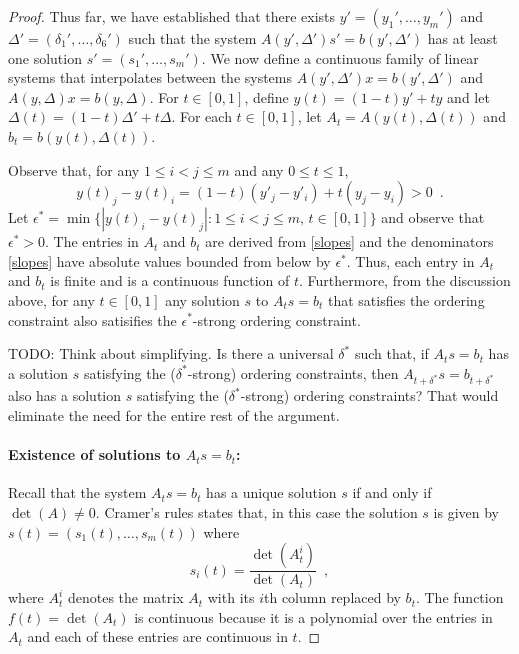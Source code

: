 \documentclass{patmorin}
\begin{document}
\begin{proof}
   Thus far, we have established that there exists $y'=(y_1',\ldots,y_m')$
   and $\Delta'=(\delta_1',\ldots,\delta_6')$ such that the
   system $A(y',\Delta')s' = b(y',\Delta')$ has at least one
   solution $s'=(s_1',\ldots,s_m')$.  We now define a continuous
   family of linear systems that interpolates between the systems
   $A(y',\Delta')x=b(y',\Delta')$ and $A(y,\Delta)x=b(y,\Delta)$.
   For $t\in[0,1]$, define $y(t) = (1-t)y' + ty$ and let
   $\Delta(t)=(1-t)\Delta' + t\Delta$.  For each $t\in [0,1]$, let
   $A_t=A(y(t),\Delta(t))$ and $b_t=b(y(t),\Delta(t))$.

   Observe that, for any $1\le i< j\le m$ and any $0\le t\le 1$,
   \[
       y(t)_j - y(t)_i = (1-t)(y'_j-y'_i) + t(y_j-y_i) > 0 \enspace .
   \]
   Let $\epsilon^*=\min\{|y(t)_i-y(t)_j| : 1\le i< j\le m,\, t\in[0,1]\}$
   and observe that $\epsilon^* >0$.  The entries in $A_t$ and $b_t$
   are derived from \eqref{slopes} and the denominators \eqref{slopes}
   have absolute values bounded from below by $\epsilon^*$.  Thus, each
   entry in $A_t$ and $b_t$ is finite and is a continuous function of $t$. 
   Furthermore, from the discussion above, for any $t\in[0,1]$ any
   solution $s$ to $A_t s =b_t$ that satisfies the ordering constraint
   also satisifies the $\epsilon^*$-strong ordering constraint.


   TODO: Think about simplifying. Is there a universal $\delta^*$
   such that, if $A_ts=b_t$ has a solution $s$ satisfying the
   ($\delta^*$-strong) ordering constraints, then
$A_{t+\delta^*}s=b_{t+\delta^*}$ also has a solution $s$ satisfying the
($\delta^*$-strong) ordering constraints?  That would eliminate the need for the entire rest of the argument.




   \paragraph{Existence of solutions to $A_ts=b_t$:}
   Recall that the system $A_ts=b_t$ has a unique solution $s$ if and
   only if $\det(A)\neq 0$.
   Cramer's rules states that, in this case the solution $s$
   is given by $s(t)=(s_1(t),\ldots,s_m(t))$
   where
   \[ 
       s_i(t) = \frac{\det(A_t^i)}{\det(A_t)} \enspace ,
   \]
   where $A_t^i$ denotes the matrix $A_t$ with its $i$th column replaced
   by $b_t$. The function $f(t)=\det(A_t)$ is continuous because it is
   a polynomial over the entries in $A_t$ and each of these entries are
   continuous in $t$.


\end{proof}
\end{document}
